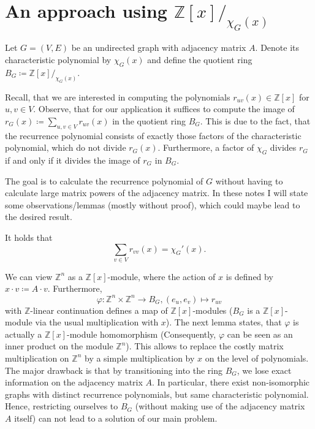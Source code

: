 \documentclass[a4paper,12pt]{article}
\begin{document}
\section{An approach using $\mathbb{Z}[x]/_{\chi_G(x)}$}

Let $G = (V,E)$ be an undirected graph with adjacency matrix $A$. Denote its characteristic polynomial by $\chi_G(x)$ and define the quotient ring $B_G \coloneqq \mathbb{Z}[x]/_{\chi_G(x)}$.

Recall, that we are interested in computing the polynomials $r_{uv}(x) \in \mathbb{Z}[x]$ for $u,v\in V$. Observe, that for our application it suffices to compute the image of $r_G(x) \coloneqq \sum_{u,v\in V} r_{uv}(x)$ in the quotient ring $B_G$. This is due to the fact, that the recurrence polynomial consists of exactly those factors of the characteristic polynomial, which do not divide $r_G(x)$. Furthermore, a factor of $\chi_G$ divides $r_G$ if and only if it divides the image of $r_G$ in $B_G$.

The goal is to calculate the recurrence polynomial of $G$ without having to calculate large matrix powers of the adjacency matrix. In these notes I will state some observations/lemmas (mostly without proof), which could maybe lead to the desired result.

\begin{lemma}
It holds that
$$
\sum_{v\in V}r_{vv}(x) = \chi_G'(x).
$$
\end{lemma}

We can view $\mathbb{Z}^n$ as a $\mathbb{Z}[x]$-module, where the action of $x$ is defined by $x \cdot v \coloneqq A\cdot v$. Furthermore,
$$
\varphi \colon \mathbb{Z}^n \times \mathbb{Z}^n \to B_G, (e_u, e_v) \mapsto r_{uv}
$$
with $\mathbb{Z}$-linear continuation defines a map of $\mathbb{Z}[x]$-modules ($B_G$ is a $\mathbb{Z}[x]$-module via the usual multiplication with $x$). The next lemma states, that $\varphi$ is actually a $\mathbb{Z}[x]$-module homomorphism (Consequently, $\varphi$ can be seen as an inner product on the module $\mathbb{Z}^n$). This allows to replace the costly matrix multiplication on $\mathbb{Z}^n$ by a simple multiplication by $x$ on the level of polynomials. The major drawback is that by transitioning into the ring $B_G$, we lose exact information on the adjacency matrix $A$. In particular, there exist non-isomorphic graphs with distinct recurrence polynomials, but same characteristic polynomial. Hence, restricting ourselves to $B_G$ (without making use of the adjacency matrix $A$ itself) can not lead to a solution of our main problem.
\end{document}

